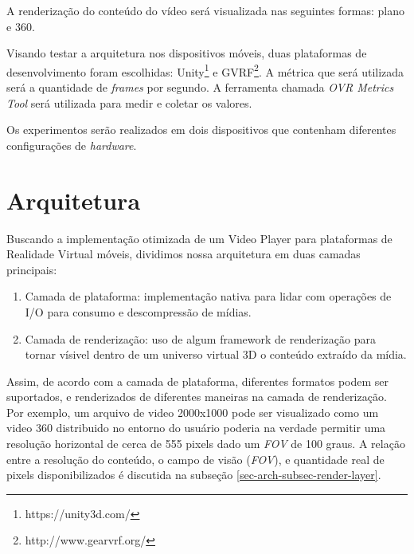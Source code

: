 \documentclass[sigconf]{acmart}
\begin{document}
A renderização do conteúdo do vídeo será visualizada nas seguintes formas: plano e 360\degree.

Visando testar a arquitetura nos dispositivos móveis, duas plataformas de desenvolvimento foram escolhidas: Unity\footnote{https://unity3d.com/} e GVRF\footnote{http://www.gearvrf.org/}. A métrica que será utilizada será a quantidade de \textit{frames} por segundo. A ferramenta chamada \textit{OVR Metrics Tool} \cite{ovrmetrictool} será utilizada para medir e coletar os valores.

Os experimentos serão realizados em dois dispositivos que contenham diferentes configurações de \textit{hardware}.

\section{Arquitetura} \label{sec-videoplayer-arch}


Buscando a implementação otimizada de um Video Player para plataformas de Realidade Virtual móveis, dividimos nossa arquitetura em duas camadas principais:

\begin{enumerate}
    \item Camada de plataforma: implementação nativa para lidar com operações de I/O para consumo e descompressão de mídias.
    \item Camada de renderização: uso de algum framework de renderização para tornar vísivel dentro de um universo virtual 3D o conteúdo extraído da mídia.
\end{enumerate}

Assim, de acordo com a camada de plataforma, diferentes formatos podem ser suportados, e renderizados de diferentes maneiras na camada de renderização. Por exemplo, um arquivo de video 2000x1000 pode ser visualizado como um video 360 distribuido no entorno do usuário poderia na verdade permitir uma resolução horizontal de cerca de 555 pixels dado um \textit{FOV} de 100 graus. A relação entre a resolução do conteúdo, o campo de visão (\textit{FOV}), e quantidade real de pixels disponibilizados é discutida na subseção \ref{sec-arch-subsec-render-layer}.
\end{document}
